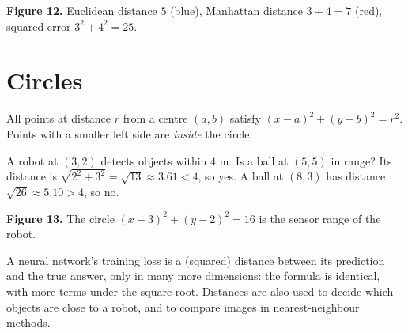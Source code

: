 \begin{center}

\small\textbf{Figure 12.} Euclidean distance $5$ (blue), Manhattan distance $3+4=7$ (red), squared error $3^2+4^2=25$.
\end{center}

\section*{Circles}
All points at distance $r$ from a centre $(a,b)$ satisfy $(x-a)^2+(y-b)^2=r^2$. Points with a smaller left side are \emph{inside} the circle.

\begin{example}
A robot at $(3,2)$ detects objects within $4$ m. Is a ball at $(5,5)$ in range? Its distance is $\sqrt{2^2+3^2}=\sqrt{13}\approx3.61<4$, so yes. A ball at $(8,3)$ has distance $\sqrt{26}\approx5.10>4$, so no.
\end{example}

\begin{center}

\small\textbf{Figure 13.} The circle $(x-3)^2+(y-2)^2=16$ is the sensor range of the robot.
\end{center}

\begin{aibox}
A neural network's training loss is a (squared) distance between its prediction and the true answer, only in many more dimensions: the formula is identical, with more terms under the square root. Distances are also used to decide which objects are close to a robot, and to compare images in nearest-neighbour methods.
\end{aibox}

